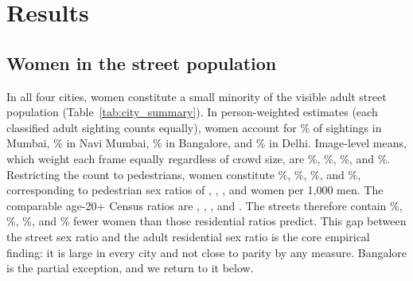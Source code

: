 \documentclass[12pt]{article}
\begin{document}
\section{Results}

\subsection{Women in the street population}

In all four cities, women constitute a small minority of the visible adult street population (Table~\ref{tab:city_summary}). In person-weighted estimates (each classified adult sighting counts equally), women account for \MumbaiAllModeShare\% of sightings in Mumbai, \NaviMumbaiAllModeShare\% in Navi Mumbai, \BangaloreAllModeShare\% in Bangalore, and \DelhiAllModeShare\% in Delhi. Image-level means, which weight each frame equally regardless of crowd size, are \MumbaiAllModeImageShare\%, \NaviMumbaiAllModeImageShare\%, \BangaloreAllModeImageShare\%, and \DelhiAllModeImageShare\%. Restricting the count to pedestrians, women constitute \MumbaiPedestrianShare\%, \NaviMumbaiPedestrianShare\%, \BangalorePedestrianShare\%, and \DelhiPedestrianShare\%, corresponding to pedestrian sex ratios of \MumbaiPedestrianSexRatio, \NaviMumbaiPedestrianSexRatio, \BangalorePedestrianSexRatio, and \DelhiPedestrianSexRatio{} women per 1,000 men. The comparable age-20+ Census ratios are \MumbaiResidentialSexRatio, \NaviMumbaiResidentialSexRatio, \BangaloreResidentialSexRatio, and \DelhiResidentialSexRatio{} \citep{census2011c14city}. The streets therefore contain \MumbaiStreetShortfall\%, \NaviMumbaiStreetShortfall\%, \BangaloreStreetShortfall\%, and \DelhiStreetShortfall\% fewer women than those residential ratios predict. This gap between the street sex ratio and the adult residential sex ratio is the core empirical finding: it is large in every city and not close to parity by any measure. Bangalore is the partial exception, and we return to it below.

%


\end{document}
